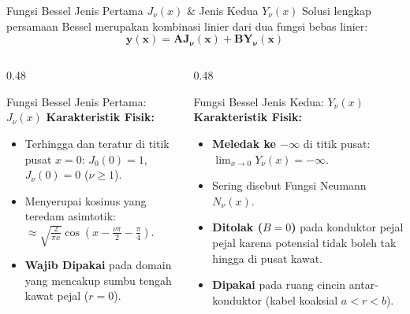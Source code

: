 \documentclass[aspectratio=169,10pt]{beamer}
\begin{document}
\begin{frame}{Fungsi Bessel Jenis Pertama $J_\nu(x)$ \& Jenis Kedua $Y_\nu(x)$}
  Solusi lengkap persamaan Bessel merupakan kombinasi linier dari dua fungsi bebas linier:
  \begin{equation*}
    \mathbf{y(x) = A J_\nu(x) + B Y_\nu(x)}
  \end{equation*}
  \begin{columns}[t]
    \begin{column}{0.48\textwidth}
      \begin{block}{Fungsi Bessel Jenis Pertama: $J_\nu(x)$}
        \small
        \textbf{Karakteristik Fisik:}
        \begin{itemize}
          \item Terhingga dan teratur di titik pusat $x = 0$: $J_0(0) = 1$, $J_\nu(0) = 0$ ($\nu \ge 1$).
          \item Menyerupai kosinus yang teredam asimtotik: $\approx \sqrt{\frac{2}{\pi x}}\cos(x - \frac{\nu\pi}{2} - \frac{\pi}{4})$.
          \item \textbf{Wajib Dipakai} pada domain yang mencakup sumbu tengah kawat pejal ($r = 0$).
        \end{itemize}
      \end{block}
    \end{column}
    \begin{column}{0.48\textwidth}
      \begin{alertblock}{Fungsi Bessel Jenis Kedua: $Y_\nu(x)$}
        \small
        \textbf{Karakteristik Fisik:}
        \begin{itemize}
          \item \textbf{Meledak ke $-\infty$} di titik pusat: $\lim_{x \to 0} Y_\nu(x) = -\infty$.
          \item Sering disebut Fungsi Neumann $N_\nu(x)$.
          \item \textbf{Ditolak ($B = 0$)} pada konduktor pejal pejal karena potensial tidak boleh tak hingga di pusat kawat.
          \item \textbf{Dipakai} pada ruang cincin antar-konduktor (kabel koaksial $a < r < b$).
        \end{itemize}
      \end{alertblock}
    \end{column}
  \end{columns}
\end{frame}
\end{document}
